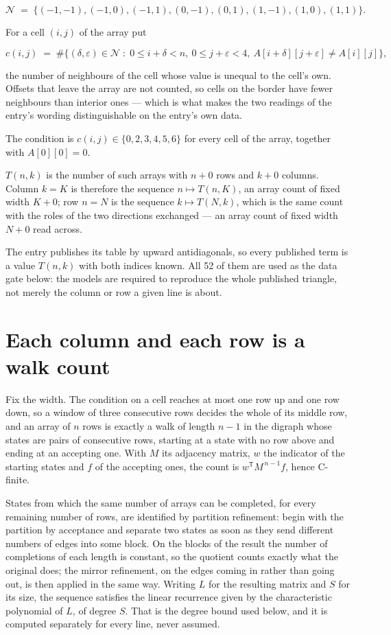 \documentclass[11pt]{article}
\theoremstyle{definition}
\begin{document}
\[\mathcal{N} \;=\; \{(-1,-1), (-1,0), (-1,1), (0,-1), (0,1), (1,-1), (1,0), (1,1)\}.\]

For a cell $(i,j)$ of the array put

\[c(i,j) \;=\; \#\bigl\{(\delta,\varepsilon)\in\mathcal{N} \;:\; 0\le i+\delta<n,\ 0\le j+\varepsilon<4,\ A[i+\delta][j+\varepsilon] \neq A[i][j]\bigr\},\]

the number of neighbours of the cell whose value is unequal to the cell's own. Offsets that leave the array are not counted, so cells on the border have fewer neighbours than interior ones --- which is what makes the two readings of the entry's wording distinguishable on the entry's own data.

The condition is $c(i,j) \in \{0, 2, 3, 4, 5, 6\}$ for every cell of the array, together with $A[0][0]=0$.

$T(n,k)$ is the number of such arrays with $n + 0$ rows and $k + 0$ columns. Column $k = K$ is therefore the sequence $n \mapsto T(n,K)$, an array count of fixed width $K + 0$; row $n = N$ is the sequence $k \mapsto T(N,k)$, which is the same count with the roles of the two directions exchanged --- an array count of fixed width $N + 0$ read across.

The entry publishes its table by upward antidiagonals, so every published term is a value $T(n,k)$ with both indices known. All 52 of them are used as the data gate below: the models are required to reproduce the whole published triangle, not merely the column or row a given line is about.

\section{Each column and each row is a walk count}

Fix the width. The condition on a cell reaches at most one row up and one row down, so a window of three consecutive rows decides the whole of its middle row, and an array of $n$ rows is exactly a walk of length $n-1$ in the digraph whose states are pairs of consecutive rows, starting at a state with no row above and ending at an accepting one. With $M$ its adjacency matrix, $w$ the indicator of the starting states and $f$ of the accepting ones, the count is $w^{\mathsf T}M^{\,n-1}f$, hence C-finite.

States from which the same number of arrays can be completed, for every remaining number of rows, are identified by partition refinement: begin with the partition by acceptance and separate two states as soon as they send different numbers of edges into some block. On the blocks of the result the number of completions of each length is constant, so the quotient counts exactly what the original does; the mirror refinement, on the edges coming in rather than going out, is then applied in the same way. Writing $L$ for the resulting matrix and $S$ for its size, the sequence satisfies the linear recurrence given by the characteristic polynomial of $L$, of degree $S$. That is the degree bound used below, and it is computed separately for every line, never assumed.
\end{document}
